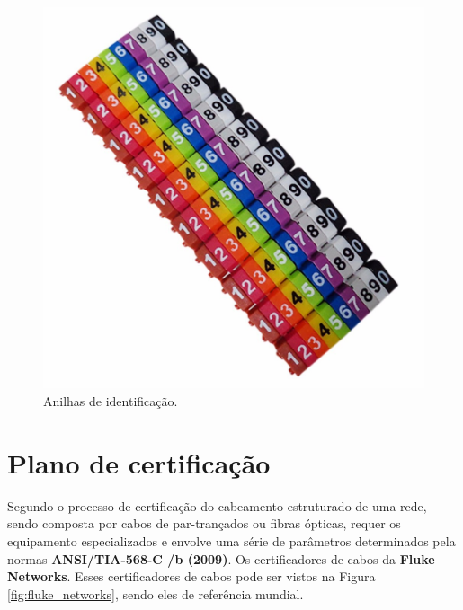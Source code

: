 \documentclass[	DIV=calc,%
							paper=a4,%
							fontsize=12pt,%
							onecolumn]{scrartcl}	 					%
\begin{document}
\begin{figure}[!htbp]
	\centering
	\includegraphics[width=\textwidth]{./imagens/identificador-de-cabos-anilhas.png}
	\caption{Anilhas de identificação.}
	\label{RV Cabeamento Estruturado}
	\label{fig:anilhas_identificacao}
\end{figure} 

\section{Plano de certificação}\label{sec:plano_certificacao}
Segundo \cite{Samuel} o processo de certificação do cabeamento estruturado de uma rede, sendo composta por cabos de par-trançados ou fibras ópticas, requer os equipamento especializados e envolve uma série de parâmetros determinados pela normas \textbf{ANSI/TIA-568-C /b (2009)}. Os certificadores de cabos da \textbf{Fluke Networks}. Esses certificadores de cabos pode ser vistos na Figura \ref{fig:fluke_networks}, sendo eles de referência mundial.
\end{document}
